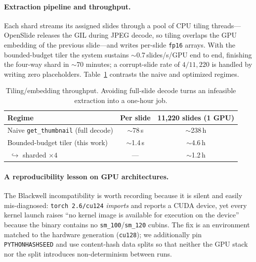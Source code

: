 \documentclass[11pt,a4paper]{article}
\newcommand{\code}[1]{\texttt{\small #1}}
\begin{document}
\paragraph{Extraction pipeline and throughput.} Each shard streams its assigned slides through a
pool of CPU tiling threads---OpenSlide releases the GIL during JPEG decode, so tiling overlaps
the GPU embedding of the previous slide---and writes per-slide \code{fp16} arrays. With the
bounded-budget tiler the system sustains $\sim$0.7\,slides/s/GPU end to end, finishing the
four-way shard in $\sim$70 minutes; a corrupt-slide rate of $4/11{,}220$ is handled by writing
zero placeholders. Table~\ref{tab:throughput} contrasts the naive and optimized regimes.

\begin{table}[h]
\centering
\caption{Tiling/embedding throughput. Avoiding full-slide decode turns an infeasible extraction
into a one-hour job.}
\label{tab:throughput}
\begin{tabular}{lcc}
\toprule
Regime & Per slide & 11{,}220 slides (1 GPU) \\
\midrule
Naive \code{get\_thumbnail} (full decode) & $\sim$78\,s & $\sim$238\,h \\
Bounded-budget tiler (this work) & $\sim$1.4\,s & $\sim$4.6\,h \\
\,\,$\hookrightarrow$ sharded $\times 4$ & --- & $\sim$1.2\,h \\
\bottomrule
\end{tabular}
\end{table}

\paragraph{A reproducibility lesson on GPU architectures.} The Blackwell incompatibility is worth
recording because it is silent and easily mis-diagnosed: \code{torch~2.6/cu124} \emph{imports}
and reports a CUDA device, yet every kernel launch raises ``no kernel image is available for
execution on the device'' because the binary contains no \code{sm\_100}/\code{sm\_120} cubins.
The fix is an environment matched to the hardware generation (\code{cu128}); we additionally pin
\code{PYTHONHASHSEED} and use content-hash data splits so that neither the GPU stack nor the
split introduces non-determinism between runs.
\end{document}

